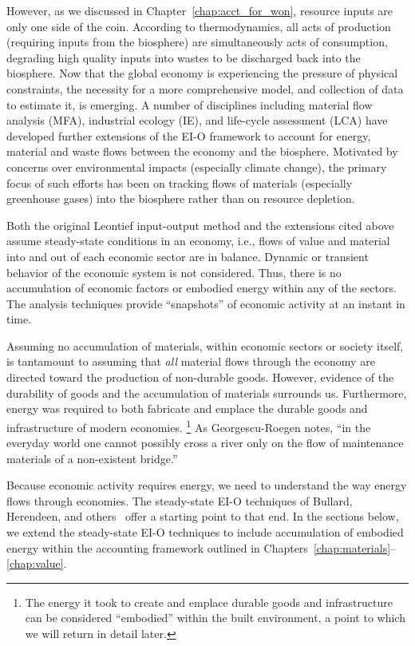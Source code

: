 However,
as we discussed in Chapter~\ref{chap:acct_for_won},
resource inputs are only one side of the coin.
According to thermodynamics,
all acts of production (requiring inputs from the biosphere)
are simultaneously acts of consumption,
degrading high quality inputs into wastes to be 
discharged back into the biosphere.
Now that the global economy is experiencing the pressure of physical constraints, 
the necessity for a more comprehensive model, 
and collection of data to estimate it,
is emerging. 
A number of disciplines including
material flow analysis (MFA), 
industrial ecology (IE), and 
life-cycle assessment (LCA) 
have developed further extensions of the EI-O
framework to account for energy, material and waste flows
between the economy and the biosphere.
Motivated by concerns over environmental impacts
(especially climate change),
the primary focus of such efforts has been on
tracking flows of materials
(especially greenhouse gases)
into the biosphere
rather than on resource depletion.\cite{ConAccount1998,
Lenzen1998, Hoekstra2003, Bailey2004, Pedersen2006, Turner2007}

Both the original Leontief input-output method
and the extensions cited above
assume steady-state conditions in an economy, 
i.e., flows of value and material into 
and out of each economic sector are in balance. 
Dynamic or transient behavior 
of the economic system is not considered. 
Thus, there is no accumulation of economic factors
or embodied energy
within any of the sectors. 
The analysis techniques provide ``snapshots'' 
of economic activity at an instant in time.

Assuming no accumulation of materials, 
within economic sectors or society itself, 
is tantamount to assuming that \emph{all} material flows 
through the economy are directed toward 
the production of non-durable goods. 
However, evidence of the durability of goods 
and the accumulation of materials surrounds us. 
Furthermore, 
energy was required to both fabricate and emplace 
the durable goods and infrastructure of modern economies.%
	\footnote{
	The energy it took to create and emplace durable goods and infrastructure 
	can be considered ``embodied'' within the built environment, 
	a point to which we will return in detail later.
	}
As Georgescu-Roegen notes, 
``in the everyday world one cannot possibly cross a river 
only on the flow of maintenance materials 
of a non-existent bridge.''~\cite{G-R1975}

Because economic activity requires energy, 
we need to understand the way energy flows through economies. 
The steady-state EI-O techniques of Bullard, Herendeen, 
and others~\cite{Bullard1975,Herendeen1978} 
offer a starting point to that end. 
In the sections below, we extend the steady-state EI-O
techniques to include accumulation of embodied energy
within the accounting framework outlined in 
Chapters~\ref{chap:materials}--\ref{chap:value}.


